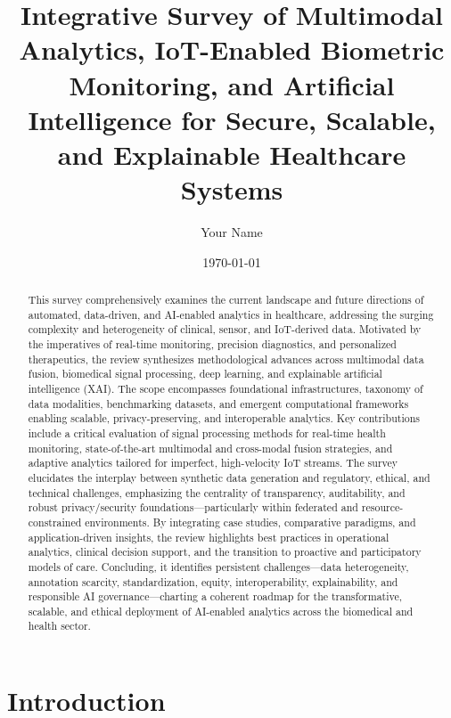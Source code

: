 \documentclass[11pt]{article}
\begin{document}
\author{Your Name}
\date{\today}

\title{\title{Integrative Survey of Multimodal Analytics, IoT-Enabled Biometric Monitoring, and Artificial Intelligence for Secure, Scalable, and Explainable Healthcare Systems}}
\maketitle

\begin{abstract}
This survey comprehensively examines the current landscape and future directions of automated, data-driven, and AI-enabled analytics in healthcare, addressing the surging complexity and heterogeneity of clinical, sensor, and IoT-derived data. Motivated by the imperatives of real-time monitoring, precision diagnostics, and personalized therapeutics, the review synthesizes methodological advances across multimodal data fusion, biomedical signal processing, deep learning, and explainable artificial intelligence (XAI). The scope encompasses foundational infrastructures, taxonomy of data modalities, benchmarking datasets, and emergent computational frameworks enabling scalable, privacy-preserving, and interoperable analytics. Key contributions include a critical evaluation of signal processing methods for real-time health monitoring, state-of-the-art multimodal and cross-modal fusion strategies, and adaptive analytics tailored for imperfect, high-velocity IoT streams. The survey elucidates the interplay between synthetic data generation and regulatory, ethical, and technical challenges, emphasizing the centrality of transparency, auditability, and robust privacy/security foundations—particularly within federated and resource-constrained environments. By integrating case studies, comparative paradigms, and application-driven insights, the review highlights best practices in operational analytics, clinical decision support, and the transition to proactive and participatory models of care. Concluding, it identifies persistent challenges—data heterogeneity, annotation scarcity, standardization, equity, interoperability, explainability, and responsible AI governance—charting a coherent roadmap for the transformative, scalable, and ethical deployment of AI-enabled analytics across the biomedical and health sector.
\end{abstract}\section{Introduction}
\end{document}
